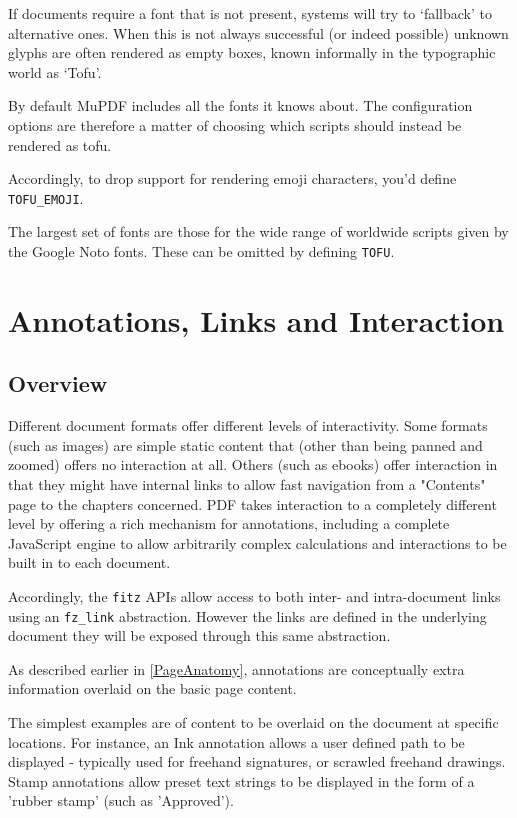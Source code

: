 \documentclass[oneside]{book}
\begin{document}
If documents require a font that is not present, systems will try to `fallback' to alternative ones. When this is not always successful (or indeed possible) unknown glyphs are often rendered as empty boxes, known informally in the typographic world as `Tofu'.

By default MuPDF includes all the fonts it knows about. The configuration options are therefore a matter of choosing which scripts should instead be rendered as tofu.

Accordingly, to drop support for rendering emoji characters, you'd define \texttt{TOFU\_EMOJI}.

The largest set of fonts are those for the wide range of worldwide scripts given by the Google Noto fonts. These can be omitted by defining \texttt{TOFU}.


\chapter{Annotations, Links and Interaction}
\label{Annotations}

\section{Overview}

Different document formats offer different levels of interactivity. Some formats (such as images) are simple static content that (other than being panned and zoomed) offers no interaction at all. Others (such as ebooks) offer interaction in that they might have internal links to allow fast navigation from a "Contents" page to the chapters concerned. PDF takes interaction to a completely different level by offering a rich mechanism for annotations, including a complete JavaScript engine to allow arbitrarily complex calculations and interactions to be built in to each document.

Accordingly, the \texttt{fitz} APIs allow access to both inter- and intra-document links using an \texttt{fz\_link} abstraction. However the links are defined in the underlying document they will be exposed through this same abstraction.

As described earlier in \ref{PageAnatomy}, annotations are conceptually extra information overlaid on the basic page content.

The simplest examples are of content to be overlaid on the document at specific locations. For instance, an Ink annotation allows a user defined path to be displayed - typically used for freehand signatures, or scrawled freehand drawings. Stamp annotations allow preset text strings to be displayed in the form of a 'rubber stamp' (such as 'Approved').
\end{document}
